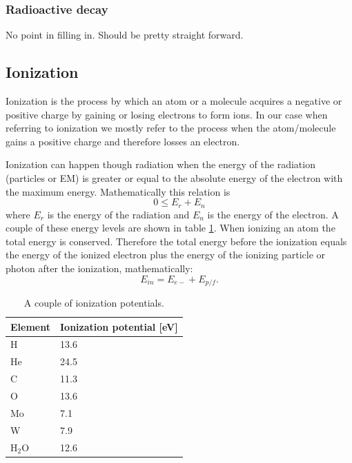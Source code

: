\documentclass[jmp, amsmath, amssymb, reprint]{article}
\numberwithin{equation}{section}
\begin{document}
\begin{multicols}{2}
\subsubsection{Radioactive decay}

No point in filling in. Should be pretty straight forward.

\subsection{Ionization}

Ionization is the process by which an atom or a molecule acquires a negative or positive charge by gaining or losing electrons to form ions. In our case when referring to ionization we mostly refer to the process when the atom/molecule gains a positive charge and therefore losses an electron.

Ionization can happen though radiation when the energy of the radiation (particles or EM) is greater or equal to the absolute energy of the electron with the maximum energy. Mathematically this relation is
\begin{equation}
0 \leq E_r + E_n
\end{equation}
where \(E_r\) is the energy of the radiation and \(E_n\) is the energy of the electron. A couple of these energy levels are shown in table \ref{tabel:4}. When ionizing an atom the total energy is conserved. Therefore the total energy before the ionization equals the energy of the ionized electron plus the energy of the ionizing particle or photon after the ionization, mathematically:
\begin{equation}
E_{in} = E_{e-} + E_{p/f}.
\end{equation}


\begin{table}[H]
  \begin{center}
    \begin{tabular}{| l | l |}
   	\hline
	Element & Ionization potential [eV]\\ \hline
	H & 13.6\\
	He & 24.5\\
	C & 11.3\\
	O & 13.6\\
	Mo & 7.1\\
	W & 7.9\\
	H\(_2\)O & 12.6\\ \hline
	\end{tabular}
    \caption{A couple of ionization potentials.}
    \label{tabel:4}
  \end{center}
\end{table}


\end{multicols}
\end{document}
